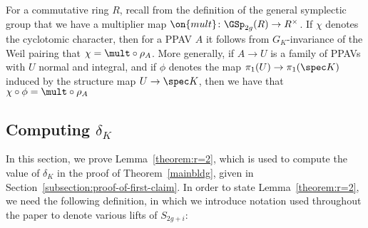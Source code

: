 \begin{remark}
	\label{remark:det-rho-is-chi}
For a commutative ring $R$, recall from the definition of the general symplectic group that we have a multiplier map $\on{mult} \colon \GSp_{2g}(R) \to R^\times$. If $\chi$ denotes the cyclotomic character, then for a PPAV $A$ it follows from $G_K$-invariance of the Weil pairing that $\chi = \mult \circ \rho_{A}$.
More generally, if $A \rightarrow U$ is a family
of PPAVs with $U$ normal and integral, and if $\phi$ denotes the map $\pi_1(U) \rightarrow \pi_1(\spec K)$ induced by the structure map $U \to \spec K$, then we have that
$\chi \circ \phi = \mult \circ \rho_A$%
\end{remark}

\subsection{Computing $\delta_K$}
\label{prelimswine}

In this section, we prove Lemma~\ref{theorem:r=2},
which is used to compute the value of $\delta_K$ in the
proof of Theorem~\ref{mainbldg}, given in Section~\ref{subsection:proof-of-first-claim}.
In order to state Lemma~\ref{theorem:r=2},
we need the following definition, in which
we introduce notation used throughout the paper to denote various lifts of $S_{2g+i}$:

